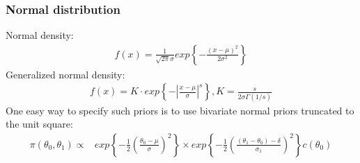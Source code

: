 \documentclass[12pt]{article}
\begin{document}
\subsubsection{Normal distribution}
Normal density:
\begin{align}
f(x)=\frac{1}{\sqrt{2\pi}\sigma}exp\left\{-\frac{(x-\mu)^2}{2\sigma^2}\right\}
\end{align}
Generalized normal density:
\begin{align}
f(x)=K\cdot exp\left\{-\left|\frac{x-\mu}{\sigma}\right|^s\right\}, K=\frac{s}{2\sigma\Gamma(1/s)}
\end{align}
One easy way to specify such priors is to use bivariate normal priors truncated to the unit square:
\begin{align*}
\pi(\theta_0,\theta_1)\propto&exp\left\{-\frac{1}{2}\left(\frac{\theta_0-\mu}{\sigma}\right)^{2}\right\}\times exp\left\{-\frac{1}{2}\left(\frac{(\theta_1-\theta_0)-\delta}{\sigma_1}\right)^{2}\right\}c(\theta_0)
\end{align*}




\end{document}
